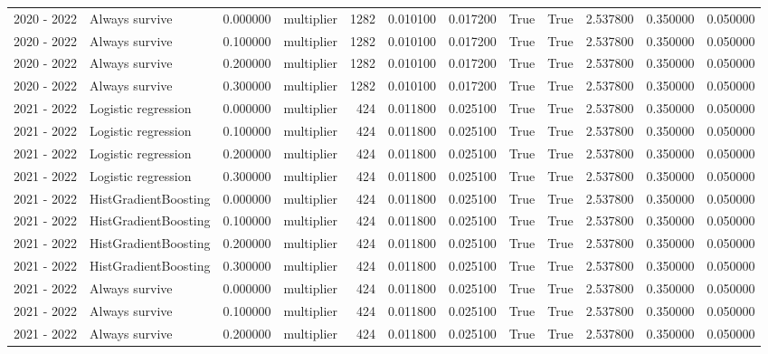 \begin{tabular}{llrlrrrrrrrr}
2020 - 2022 & Always survive & 0.000000 & multiplier & 1282 & 0.010100 & 0.017200 & True & True & 2.537800 & 0.350000 & 0.050000 \\
2020 - 2022 & Always survive & 0.100000 & multiplier & 1282 & 0.010100 & 0.017200 & True & True & 2.537800 & 0.350000 & 0.050000 \\
2020 - 2022 & Always survive & 0.200000 & multiplier & 1282 & 0.010100 & 0.017200 & True & True & 2.537800 & 0.350000 & 0.050000 \\
2020 - 2022 & Always survive & 0.300000 & multiplier & 1282 & 0.010100 & 0.017200 & True & True & 2.537800 & 0.350000 & 0.050000 \\
2021 - 2022 & Logistic regression & 0.000000 & multiplier & 424 & 0.011800 & 0.025100 & True & True & 2.537800 & 0.350000 & 0.050000 \\
2021 - 2022 & Logistic regression & 0.100000 & multiplier & 424 & 0.011800 & 0.025100 & True & True & 2.537800 & 0.350000 & 0.050000 \\
2021 - 2022 & Logistic regression & 0.200000 & multiplier & 424 & 0.011800 & 0.025100 & True & True & 2.537800 & 0.350000 & 0.050000 \\
2021 - 2022 & Logistic regression & 0.300000 & multiplier & 424 & 0.011800 & 0.025100 & True & True & 2.537800 & 0.350000 & 0.050000 \\
2021 - 2022 & HistGradientBoosting & 0.000000 & multiplier & 424 & 0.011800 & 0.025100 & True & True & 2.537800 & 0.350000 & 0.050000 \\
2021 - 2022 & HistGradientBoosting & 0.100000 & multiplier & 424 & 0.011800 & 0.025100 & True & True & 2.537800 & 0.350000 & 0.050000 \\
2021 - 2022 & HistGradientBoosting & 0.200000 & multiplier & 424 & 0.011800 & 0.025100 & True & True & 2.537800 & 0.350000 & 0.050000 \\
2021 - 2022 & HistGradientBoosting & 0.300000 & multiplier & 424 & 0.011800 & 0.025100 & True & True & 2.537800 & 0.350000 & 0.050000 \\
2021 - 2022 & Always survive & 0.000000 & multiplier & 424 & 0.011800 & 0.025100 & True & True & 2.537800 & 0.350000 & 0.050000 \\
2021 - 2022 & Always survive & 0.100000 & multiplier & 424 & 0.011800 & 0.025100 & True & True & 2.537800 & 0.350000 & 0.050000 \\
2021 - 2022 & Always survive & 0.200000 & multiplier & 424 & 0.011800 & 0.025100 & True & True & 2.537800 & 0.350000 & 0.050000 \\

\end{tabular}
